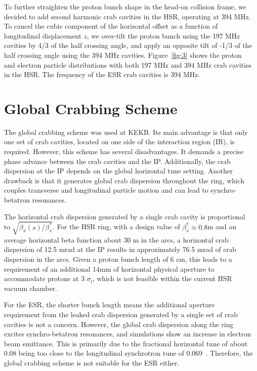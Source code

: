 \documentclass[letter,
keeplastbox,   %
]{jacow}
\begin{document}
To further straighten the proton bunch shape in the head-on collision frame, we decided to add second harmonic crab cavities in the HSR, operating at 394 MHz. To cancel the cubic component of the horizontal offset as a function of longitudinal displacement $z$, we over-tilt the proton bunch using the 197 MHz cavities by 4/3 of the half crossing angle, and apply an opposite tilt of -1/3 of the half crossing angle using the 394 MHz cavities. Figure~\ref{fig:3} shows the proton and electron particle distributions with both 197 MHz  and 394 MHz crab cavities in the HSR. The frequency of the ESR crab cavities is 394 MHz.

\section{Global Crabbing Scheme}

The global crabbing scheme was used at KEKB. Its main advantage is that only one set of crab cavities, located on one side of the interaction region (IR), is required. However, this scheme has several disadvantages. It demands a precise phase advance between the crab cavities and the IP. Additionally, the crab dispersion at the IP depends on the global horizontal tune setting. Another drawback is that it generates global crab dispersion throughout the ring, which couples transverse and longitudinal particle motion and can lead to synchro-betatron resonances.

The horizontal crab dispersion generated by a single crab cavity is proportional to $\sqrt{\beta_x(s)/\beta^*_x}$. For the HSR ring, with a design value of $\beta_x^* \approx 0.8$m and an average horizontal beta function about 30 m in the arcs, a horizontal crab dispersion of 12.5 mrad at the IP results in approximately 76.5 mrad of crab dispersion in the arcs. Given a proton bunch length of  6 cm, this leads to a requirement of an additional  14mm of horizontal physical aperture to accommodate protons at 3 $\sigma_l$, which is not feasible within the current HSR vacuum chamber.

For the ESR, the shorter bunch length means the additional aperture requirement from the leaked crab dispersion generated by a single set of crab cavities is not a concern. However, the global crab dispersion along the ring  excites synchro-betatron resonances, and simulations show an increase in electron beam emittance. This is primarily due to the fractional horizontal tune of about 0.08 being too close to the longitudinal synchrotron tune of 0.069~\cite{PRAB-Derong}. Therefore, the global crabbing scheme is not suitable for the ESR either.
\end{document}
